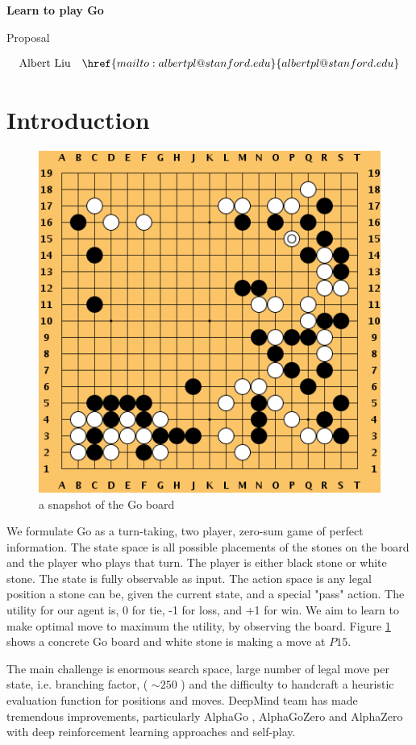 \documentclass{article}
\begin{document}
\hrulefill \par
{\Large \textbf{Learn to play Go}\par}
{\Large Proposal\par}
\hrulefill \par
\begin{align*}
\mathrm{Albert\ Liu} &&\href{mailto:albertpl@stanford.edu}{albertpl@stanford.edu}\\
\end{align*}

\section{Introduction}
\begin{figure}[H]
\begin{center}
\includegraphics[width=0.25\linewidth]{goboard}
\end{center}
\caption{a snapshot of the Go board}
\label{fig:goboard}
\end{figure}

We formulate Go as a turn-taking, two player, zero-sum game of perfect information. The state space is all possible placements of the stones on the board and the player who plays that turn. The player is either black stone or white stone. The state is fully observable as input. The action space is any legal position a stone can be, given the current state, and a special "pass" action.  The utility for our agent is, 0 for tie, -1 for loss, and +1 for win. We aim to learn to make optimal move to maximum the utility, by observing the board. Figure \ref{fig:goboard} shows a concrete Go board and white stone is making a move at $P15$.

The main challenge is enormous search space, large number of legal move per state, i.e. branching factor, ( $\sim 250$ ) and the difficulty to handcraft a heuristic evaluation function for positions and moves. DeepMind team has made tremendous improvements, particularly AlphaGo \cite{silver2016mastering}, AlphaGoZero \cite{silver2017masteringalphagozero} and AlphaZero \cite{silver2017masteringalphazero} with deep reinforcement learning approaches and self-play.
\end{document}
